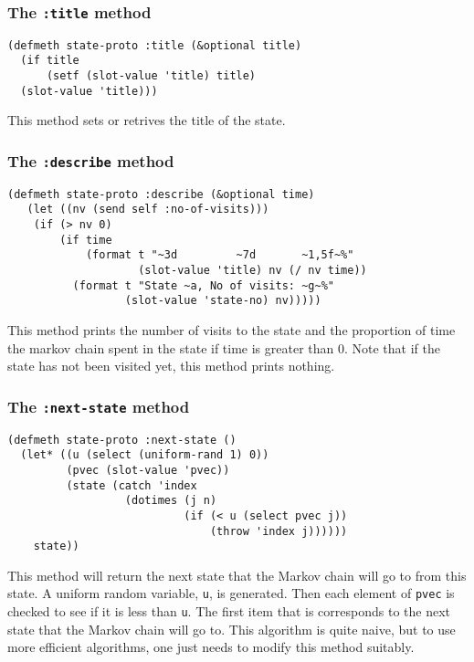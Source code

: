 \subsubsection{The {\tt :title} method}
\label{subsubsec:states-title}
\begin{verbatim}
(defmeth state-proto :title (&optional title)
  (if title 
      (setf (slot-value 'title) title)
  (slot-value 'title)))
\end{verbatim}
This method sets or retrives the title of the state.


\subsubsection{The {\tt :describe} method}
\label{subsubsec:states-describe}
\begin{verbatim}
(defmeth state-proto :describe (&optional time)
   (let ((nv (send self :no-of-visits)))
    (if (> nv 0)
        (if time
            (format t "~3d         ~7d       ~1,5f~%"
                    (slot-value 'title) nv (/ nv time))
          (format t "State ~a, No of visits: ~g~%" 
                  (slot-value 'state-no) nv)))))
 \end{verbatim}
This method prints the number of visits to the state and the
proportion of time the markov chain spent in the state if time is
greater than 0.  Note that if the state has not been visited yet, this
method prints nothing.


\subsubsection{The {\tt :next-state} method}
\label{subsubsec:next-state}
\begin{verbatim}
(defmeth state-proto :next-state ()
  (let* ((u (select (uniform-rand 1) 0))
         (pvec (slot-value 'pvec))
         (state (catch 'index
                  (dotimes (j n)
                           (if (< u (select pvec j))
                               (throw 'index j))))))
    state))
\end{verbatim}
This method will return the next state that the Markov chain will go to from
this state.  A uniform random variable, {\tt u}, is generated.  Then each
element of {\tt pvec} is checked to see if it is less than {\tt u}.  
The first item that is corresponds to the next state that the Markov chain 
will go to.  This algorithm is quite naive, but to use more efficient
algorithms, one just needs to modify this method suitably. 
